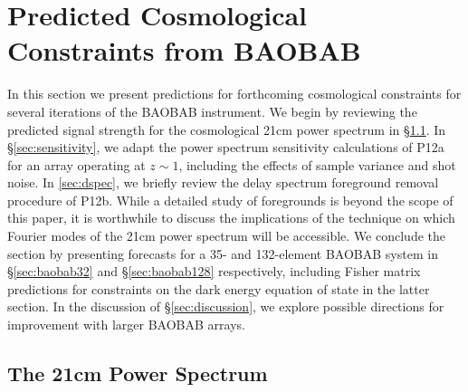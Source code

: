 \documentclass[10pt,iop]{emulateapj}
\begin{document}
\section{Predicted Cosmological Constraints from BAOBAB}
\label{sec:predictions}

In this section we present predictions for forthcoming cosmological constraints for
several iterations of the BAOBAB instrument.  We begin by reviewing the predicted
signal strength for the cosmological 21cm power spectrum in \S\ref{sec:ps21}.
In \S\ref{sec:sensitivity}, we adapt the power spectrum sensitivity calculations of 
P12a for an array operating at $z\sim 1$, including the effects of sample variance
and shot noise.  In \ref{sec:dspec}, we briefly review the delay spectrum
foreground removal procedure of P12b.
While a detailed study of foregrounds is beyond the scope of this paper,
it is worthwhile to discuss the implications of the technique on which
Fourier modes of the 21cm power spectrum will be accessible.
We conclude the section by presenting forecasts for a 35- and 132-element BAOBAB
system in \S\ref{sec:baobab32} and \S\ref{sec:baobab128}
respectively, including Fisher matrix predictions for constraints on the dark energy 
equation of state in the latter section.  In the discussion of \S\ref{sec:discussion},
we explore possible directions for improvement with larger BAOBAB arrays.

\subsection{The 21cm Power Spectrum}
\label{sec:ps21}
\end{document}
